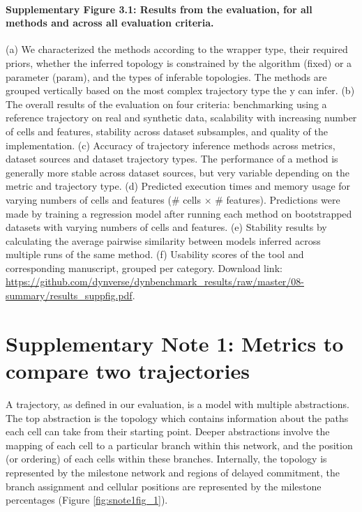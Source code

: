 \paragraph{Supplementary Figure 3.1: Results from the evaluation, for all methods and across all evaluation criteria.} \label{fig:suppfig_2}
(a) We characterized the methods according to the wrapper type, their required priors, whether the inferred topology is constrained by the algorithm (fixed) or a parameter (param), and the types of inferable topologies. The methods are grouped vertically based on the most complex trajectory type the y can infer. (b) The overall results of the evaluation on four criteria: benchmarking using a reference trajectory on real and synthetic data, scalability with increasing number of cells and features, stability across dataset subsamples, and quality  of  the  implementation.  (c)  Accuracy  of  trajectory  inference  methods  across metrics,  dataset sources  and  dataset  trajectory types. The performance of a method is generally more stable across dataset sources, but very  variable depending on the metric and trajectory  type.  (d)  Predicted  execution  times  and memory  usage  for  varying  numbers  of  cells  and  features  (\# cells $\times$ \# features). Predictions were made by training a regression model after running each method on bootstrapped datasets with varying numbers of cells and features. (e) Stability results by calculating the average pairwise similarity between models inferred across multiple runs of the same method. (f) Usability scores of the tool and corresponding manuscript, grouped per category.
Download link: \url{https://github.com/dynverse/dynbenchmark_results/raw/master/08-summary/results_suppfig.pdf}.

\section{Supplementary Note 1: Metrics to compare two trajectories} \label{sec:dynb_supn1}

A trajectory, as defined in our evaluation, is a model with multiple abstractions. The top abstraction is the topology which contains information about the paths each cell can take from their starting point. Deeper abstractions involve the mapping of each cell to a particular branch within this network, and the position (or ordering) of each cells within these branches. Internally, the topology is represented by the milestone network and regions of delayed commitment, the branch assignment and cellular positions are represented by the milestone percentages (Figure \ref{fig:snote1fig_1}).

